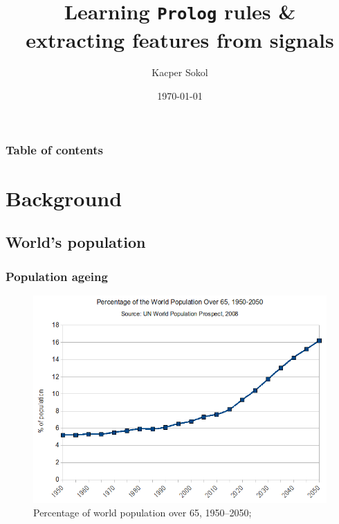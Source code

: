 \documentclass[09pt]{beamer}
\begin{document}
\author{Kacper Sokol}
\title[Learning \texttt{Prolog} rules]{Learning \texttt{Prolog} rules \& \\extracting features from signals}
\date{\today}

\begin{frame}
\titlepage
\end{frame}

\begin{frame}
  \frametitle{Table of contents}
  \tableofcontents
\end{frame} 


\section{Background}

  \subsection{World's population}
  \begin{frame}[plain]
    \frametitle{Population ageing}
    \begin{figure}
      \centering
      \includegraphics[scale=.4]{gfx/populationOver65}
      \caption{Percentage of world population over 65, 1950--2050; \cite{populationAgeing}}
    \end{figure}
  \end{frame}
\end{document}
